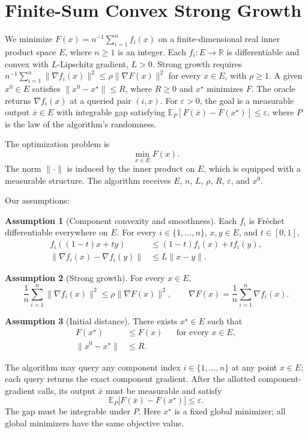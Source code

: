 \documentclass[10pt]{article}
\theoremstyle{definition}
\newtheorem{assumption}{Assumption}
\begin{document}
\section*{Finite-Sum Convex Strong Growth}
We minimize $F(x)=n^{-1}\sum_{i=1}^n f_i(x)$ on a finite-dimensional real inner product space $E$, where $n\geq1$ is an integer. Each $f_i:E\to\mathbb{R}$ is differentiable and convex with $L$-Lipschitz gradient, $L>0$. Strong growth requires $n^{-1}\sum_{i=1}^n\|\nabla f_i(x)\|^2\leq\rho\|\nabla F(x)\|^2$ for every $x\in E$, with $\rho\geq1$. A given $x^0\in E$ satisfies $\|x^0-x^\star\|\leq R$, where $R\geq0$ and $x^\star$ minimizes $F$. The oracle returns $\nabla f_i(x)$ at a queried pair $(i,x)$. For $\varepsilon>0$, the goal is a measurable output $\bar{x}\in E$ with integrable gap satisfying $\mathbb{E}_{P}[F(\bar{x})-F(x^\star)]\leq\varepsilon$, where $P$ is the law of the algorithm's randomness.

The optimization problem is
\[
\min_{x\in E} F(x).
\]
The norm $\|\cdot\|$ is induced by the inner product on $E$, which is equipped with a measurable structure. The algorithm receives $E$, $n$, $L$, $\rho$, $R$, $\varepsilon$, and $x^0$.

Our assumptions:
\begin{assumption}[Component convexity and smoothness]
Each $f_i$ is Fr\'echet differentiable everywhere on $E$. For every $i\in\{1,\ldots,n\}$, $x,y\in E$, and $t\in[0,1]$,
\[
\begin{aligned}
f_i((1-t)x+ty)&\leq(1-t)f_i(x)+t f_i(y),\\
\|\nabla f_i(x)-\nabla f_i(y)\|&\leq L\|x-y\|.
\end{aligned}
\]
\end{assumption}

\begin{assumption}[Strong growth]
For every $x\in E$,
\[
\frac{1}{n}\sum_{i=1}^n\|\nabla f_i(x)\|^2
\leq \rho\|\nabla F(x)\|^2,
\qquad
\nabla F(x)=\frac{1}{n}\sum_{i=1}^n\nabla f_i(x).
\]
\end{assumption}

\begin{assumption}[Initial distance]
There exists $x^\star\in E$ such that
\[
\begin{aligned}
F(x^\star)&\leq F(x) &&\text{for every }x\in E,\\
\|x^0-x^\star\|&\leq R.
\end{aligned}
\]
\end{assumption}

The algorithm may query any component index $i\in\{1,\ldots,n\}$ at any point $x\in E$; each query returns the exact component gradient. After the allotted component-gradient calls, its output $\bar{x}$ must be measurable and satisfy
\[
\mathbb{E}_{P}\bigl[F(\bar{x})-F(x^\star)\bigr]
\leq\varepsilon.
\]
The gap must be integrable under $P$. Here $x^\star$ is a fixed global minimizer; all global minimizers have the same objective value.
\end{document}

